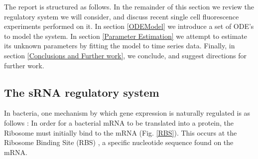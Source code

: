 \documentclass[10pt,journal]{./IEEE_latex_class/IEEEtran}
\begin{document}
The report is structured as follows. In the remainder of this section we review the regulatory system we will consider, and discuss recent single cell fluorescence experiments performed on it. In section \ref{ODEModel} we introduce a set of ODE's to model the system. In section \ref{Parameter Estimation} we attempt to estimate its unknown parameters by fitting the model to time series data. Finally, in section \ref{Conclusions and Further work}, we conclude, and suggest directions for further work.




\subsection{The sRNA regulatory system}
\label{The sRNA regulatory system}
In bacteria, one mechanism by which gene expression is naturally regulated is as follows \cite{Soper2010}: In order for a bacterial mRNA to be translated into a protein, the Ribosome must initially bind to the mRNA (Fig. \ref{RBS}). This occurs at the Ribosome Binding Site (RBS) \cite{Shine1974}, a specific nucleotide sequence found on the mRNA. 
\end{document}
